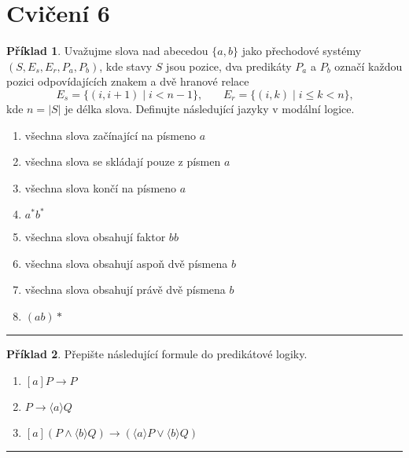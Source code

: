 \documentclass[a4paper]{article}
\theoremstyle{definition}
\newtheorem{priklad}{Příklad}
\begin{document}
\section*{Cvičení 6}
\setcounter{priklad}{0}
\begin{priklad}
    Uvažujme slova nad abecedou $ \{a,b\} $ jako přechodové systémy $ (S,E_s,E_r,P_a,P_b) $, kde stavy $ S $ jsou pozice, dva predikáty $ P_a $ a $ P_b $ označí každou pozici odpovídajících znakem a dvě hranové relace
    \[ E_s = \{(i,i+1) \mid i<n-1\}\mbox{,}\qquad E_r = \{(i,k) \mid i\leq k<n\}\mbox{,} \]
    kde $ n = |S| $ je délka slova. Definujte následující jazyky v modální logice.
    
    \begin{enumerate}
      \item všechna slova začínající na písmeno $ a $
      \item všechna slova se skládají pouze z písmen $ a $
      \item všechna slova končí na písmeno $ a $
      \item $ a^*b^* $
      \item všechna slova obsahují faktor $ bb $
      \item všechna slova obsahují aspoň dvě písmena $ b $
      \item všechna slova obsahují právě dvě písmena $ b $
      \item $ (ab)* $
    \end{enumerate}
    
\noindent\rule{\linewidth}{.2pt}    
\end{priklad}

\begin{priklad}
    Přepište následující formule do predikátové logiky.
    
    \begin{enumerate}
      \item $ [a]P\rightarrow P $
      \item $ P\rightarrow \langle a\rangle Q $
      \item $ [a](P\wedge \langle b\rangle Q) \rightarrow (\langle a\rangle P\vee\langle b\rangle Q) $
    \end{enumerate}
    
\noindent\rule{\linewidth}{.2pt}    
\end{priklad}
\end{document}
